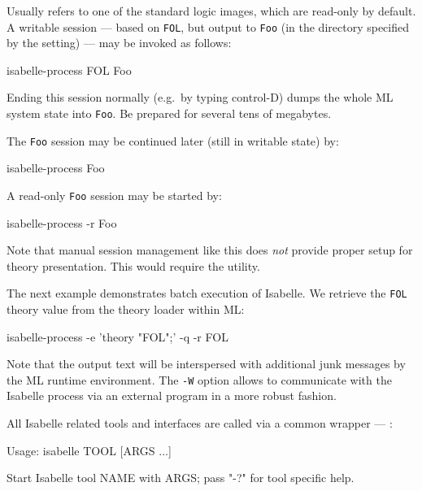 \begin{isabellebody}
\begin{isamarkuptext}
  Usually \hyperlink{setting.ISABELLE-LOGIC}{\mbox{}} refers to one of the standard
  logic images, which are read-only by default.  A writable session
  --- based on \verb|FOL|, but output to \verb|Foo| (in the
  directory specified by the \hyperlink{setting.ISABELLE-OUTPUT}{\mbox{}} setting) ---
  may be invoked as follows:
\begin{ttbox}
isabelle-process FOL Foo
\end{ttbox}
  Ending this session normally (e.g.\ by typing control-D) dumps the
  whole ML system state into \verb|Foo|. Be prepared for several
  tens of megabytes.

  The \verb|Foo| session may be continued later (still in
  writable state) by:
\begin{ttbox}
isabelle-process Foo
\end{ttbox}
  A read-only \verb|Foo| session may be started by:
\begin{ttbox}
isabelle-process -r Foo
\end{ttbox}

  \medskip Note that manual session management like this does
  \emph{not} provide proper setup for theory presentation.  This would
  require the \hyperlink{tool.usedir}{\mbox{}} utility.

  \bigskip The next example demonstrates batch execution of Isabelle.
  We retrieve the \verb|FOL| theory value from the theory loader
  within ML:
\begin{ttbox}
isabelle-process -e 'theory "FOL";' -q -r FOL
\end{ttbox}
  Note that the output text will be interspersed with additional junk
  messages by the ML runtime environment.  The \verb|-W| option
  allows to communicate with the Isabelle process via an external
  program in a more robust fashion.%
\end{isamarkuptext}%
\isamarkuptrue%
%
\isamarkuptrue%
%
\begin{isamarkuptext}%
All Isabelle related tools and interfaces are called via a common
  wrapper --- \hyperlink{executable.isabelle}{\mbox{}}:

\begin{ttbox}
Usage: isabelle TOOL [ARGS ...]

  Start Isabelle tool NAME with ARGS; pass "-?" for tool specific help.


\end{ttbox}
\end{isamarkuptext}
\end{isabellebody}
